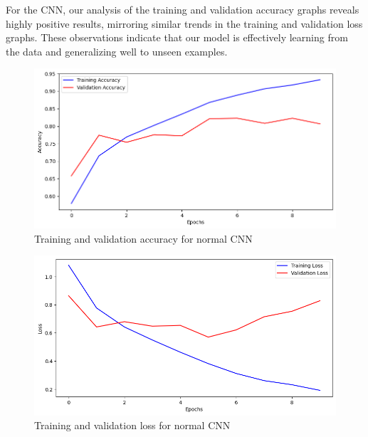\documentclass[conference]{IEEEtran}
\begin{document}
For the CNN, our analysis of the training and validation accuracy graphs reveals highly positive results, mirroring similar trends in the training and validation loss graphs. These observations indicate that our model is effectively learning from the data and generalizing well to unseen examples.

\begin{figure}[H]
    \centering
    \includegraphics[width=1\linewidth]{images//CNN/training_accuracy.png}
    \caption{Training and validation accuracy for normal CNN}
    \label{fig:enter-label}
\end{figure}

\begin{figure}[H]
    \centering
    \includegraphics[width=1\linewidth]{images//CNN/training_loss.png}
    \caption{Training and validation loss for normal CNN}
    \label{fig:cnn_normal_training_loss}
\end{figure}
\end{document}
